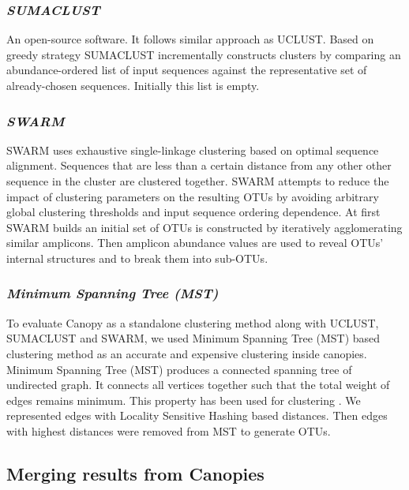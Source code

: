 \documentclass[10pt, conference, compsocconf]{IEEEtran}
\begin{document}
\subsubsection{\textit{SUMACLUST}}
An open-source software. It follows similar approach as UCLUST. Based on greedy strategy SUMACLUST incrementally constructs clusters by comparing an abundance-ordered list of input sequences against the representative set of already-chosen sequences. Initially this list is empty.

\subsubsection{\textit{SWARM}}
SWARM uses exhaustive single-linkage clustering based on optimal sequence alignment. Sequences that are less than a certain distance from any other other sequence in the cluster are clustered together. SWARM attempts to reduce the impact of clustering parameters on the resulting OTUs by avoiding arbitrary global clustering thresholds and input sequence ordering dependence. At first SWARM builds an initial set of OTUs is constructed by iteratively agglomerating similar amplicons. Then amplicon abundance values are used to reveal OTUs’ internal structures and to break them into sub-OTUs.

\subsubsection{\textit{Minimum Spanning Tree (MST)}}
To evaluate Canopy as a standalone clustering method along with UCLUST, SUMACLUST and SWARM, we used Minimum Spanning Tree (MST) based clustering method as an accurate and expensive clustering inside canopies. Minimum Spanning Tree (MST) produces a connected spanning tree of undirected graph. It connects all vertices together such that the total weight of edges remains minimum. This property has been used for clustering \cite{MARMstCluster}\cite{MARMstClustering2}\cite{MARMstClustering3}. We represented edges with Locality Sensitive Hashing based distances. Then edges with highest distances were removed from MST to generate OTUs.

\subsection{\textbf{Merging results from Canopies}}
\end{document}
